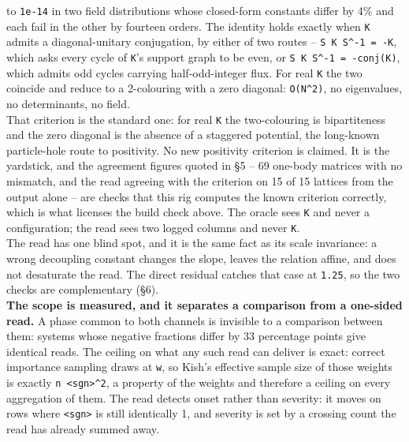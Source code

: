 \documentclass[10pt,letterpaper,twocolumn]{article}
\begin{document}
{to \texttt{1e-{}\allowbreak{}14} in two field distributions whose closed-form constants differ by 4\% and each fail in the
other by fourteen orders. The identity holds exactly when \texttt{K} admits a diagonal-unitary
conjugation, by either of two routes -- \texttt{S\ K\ S\^{}-{}\allowbreak{}1\ =\allowbreak{}\ -{}\allowbreak{}K}, which asks every cycle of \texttt{K}'s support
graph to be even, or \texttt{S\ K\ S\^{}-{}\allowbreak{}1\ =\allowbreak{}\ -{}\allowbreak{}conj(\allowbreak{}K)\allowbreak{}}, which admits odd cycles carrying half-odd-integer flux.
For real \texttt{K} the two coincide and reduce to a 2-colouring with a zero diagonal: \texttt{O(\allowbreak{}N\^{}2)\allowbreak{}}, no
eigenvalues, no determinants, no field.\\
That criterion is the standard one: for real \texttt{K} the two-colouring is bipartiteness and the zero
diagonal is the absence of a staggered potential, the long-known particle-hole route to positivity.
No new positivity criterion is claimed. It is the yardstick, and the agreement figures quoted in §5
-- 69 one-body matrices with no mismatch, and the read agreeing with the criterion on 15 of 15
lattices from the output alone -- are checks that this rig computes the known criterion correctly,
which is what licenses the build check above. The oracle sees \texttt{K} and never a configuration; the
read sees two logged columns and never \texttt{K}.\\
The read has one blind spot, and it is the same fact as its scale invariance: a wrong decoupling
constant changes the slope, leaves the relation affine, and does not desaturate the read. The
direct residual catches that case at \texttt{1.\allowbreak{}25}, so the two checks are complementary (§6).\\
\textbf{The scope is measured, and it separates a comparison from a one-sided read.} A phase common to
both channels is invisible to a comparison between them: systems whose negative fractions differ by
33 percentage points give identical reads. The ceiling on what any such read can deliver is exact:
correct importance sampling draws at \texttt{\textbar{}\allowbreak{}w\textbar{}\allowbreak{}}, so Kish's effective sample size of those weights is
exactly \texttt{n\ \textless{}\allowbreak{}sgn\textgreater{}\allowbreak{}\^{}2}, a property of the weights and therefore a ceiling on every aggregation of
them. The read detects onset rather than severity: it moves on rows where \texttt{\textless{}\allowbreak{}sgn\textgreater{}\allowbreak{}} is still
identically 1, and severity is set by a crossing count the read has already summed away.
}
\end{document}

